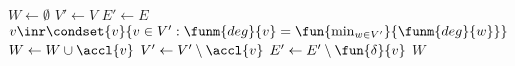 \State $W\gets\emptyset$
\State $V'\gets V$
\State $E'\gets E$
\State $v\inr\condset{v}{v\in V':\funm{deg}{v}=\fun{\min_{w\in V'}}{\funm{deg}{w}}}$
\State $W\gets W\cup\accl{v}$
\State $V'\gets V'\setminus\accl{v}$
\State $E'\gets E'\setminus\fun{\delta}{v}$
\EndWhile
\State \Return $W$
\EndFunction